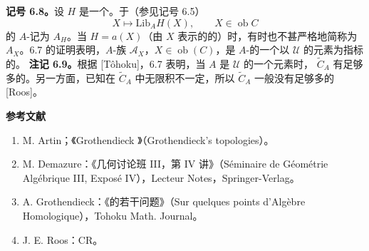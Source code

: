 \textbf{记号 6.8。}设 $H$ 是一个。于（参见记号 6.5）
\[X\longmapsto\mathrm{Lib}_A H(X),\qquad X\in\operatorname{ob}C\]
的 $A$-记为 $A_H$。当 $H=a(X)$（由 $X$ 表示的的）时，有时也不甚严格地简称为 $A_X$。6.7 的证明表明，$A$-族 $\mathscr A_X$，$X\in\operatorname{ob}(C)$，是 $A$-的一个以 $\mathcal U$ 的元素为指标的。
\textbf{注记 6.9。}根据 [Tôhoku]，6.7 表明，当 $A$ 是 $\mathcal U$ 的一个元素时， $\widetilde C_A$ 有足够多的。另一方面，已知在 $\widetilde C_A$ 中无限积不一定，所以 $\widetilde C_A$ 一般没有足够多的 [Roos]。

\bigskip\noindent\textbf{参考文献}
\begin{enumerate}
\item[{[1]}] M. Artin；《Grothendieck 》（Grothendieck's topologies）。
\item[{[2]}] M. Demazure：《几何讨论班 III，第 IV 讲》（Séminaire de Géométrie Algébrique III, Exposé IV），Lecteur Notes，Springer-Verlag。
\item[{[3]}] A. Grothendieck：《的若干问题》（Sur quelques points d'Algèbre Homologique），Tohoku Math. Journal。
\item[{[4]}] J. E. Roos：CR。
\end{enumerate}
